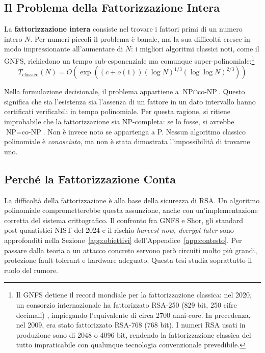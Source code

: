 \begin{onehalfspace}

\bigskip
\section{Il Problema della Fattorizzazione Intera}

La \textbf{fattorizzazione intera} consiste nel trovare i fattori primi di un numero intero $N$. Per numeri piccoli il problema è banale, ma la sua difficoltà cresce in modo impressionante all'aumentare di $N$: i migliori algoritmi classici noti, come il \ac{GNFS}, richiedono un tempo sub-esponenziale ma comunque super-polinomiale:\footnote{Il \ac{GNFS} detiene il record mondiale per la fattorizzazione classica: nel 2020, un consorzio internazionale ha fattorizzato RSA-250 (829 bit, 250 cifre decimali) \cite{rsa250_2020}, impiegando l'equivalente di circa 2700 anni-core. In precedenza, nel 2009, era stato fattorizzato RSA-768 (768 bit). I numeri RSA usati in produzione sono di 2048 o 4096 bit, rendendo la fattorizzazione classica del tutto impraticabile con qualunque tecnologia convenzionale prevedibile.}
\begin{equation}
    T_{\text{classico}}(N) = O\!\left(\exp\!\left((c+o(1))(\log N)^{1/3}(\log\log N)^{2/3}\right)\right)
    \label{eq:gnfs_complexity}
\end{equation}

Nella formulazione decisionale, il problema appartiene a $\text{NP} \cap \text{co-NP}$. Questo significa che sia l'esistenza sia l'assenza di un fattore in un dato intervallo hanno certificati verificabili in tempo polinomiale. Per questa ragione, si ritiene improbabile che la fattorizzazione sia NP-completa: se lo fosse, si avrebbe $\text{NP} = \text{co-NP}$. Non è invece noto se appartenga a P. Nessun algoritmo classico polinomiale è \emph{conosciuto}, ma non è stata dimostrata l'impossibilità di trovarne uno.

\subsection{Perché la Fattorizzazione Conta}

La difficoltà della fattorizzazione è alla base della sicurezza di \ac{RSA}. Un algoritmo polinomiale comprometterebbe questa assunzione, anche con un'implementazione corretta del sistema crittografico. Il confronto fra \ac{GNFS} e Shor, gli standard post-quantistici \ac{NIST} del 2024 e il rischio \emph{harvest now, decrypt later} sono approfonditi nella Sezione~\ref{app:obiettivi} dell'Appendice~\ref{app:contesto}. Per passare dalla teoria a un attacco concreto servono però circuiti molto più grandi, protezione fault-tolerant e hardware adeguato. Questa tesi studia soprattutto il ruolo del rumore.


\end{onehalfspace}
